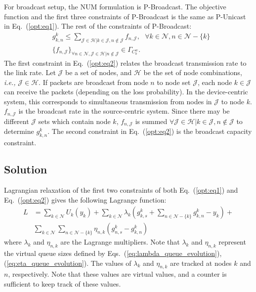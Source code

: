 \documentclass[conference]{IEEEtran}
\newcommand{\ie}{{\em i.e., }}
\newcommand{\Jset}{\mathcal{J}}
\newcommand{\Nset}{\mathcal{N}}
\newcommand{\Hset}{\mathcal{H}}
\begin{document}
For broadcast setup, the NUM formulation is P-Broadcast. The objective function and the first three constraints of P-Broadcast is the same as P-Unicast in Eq.~(\ref{opt:eq1}). The rest of the constraints of P-Broadcast:
\begin{align} \label{opt:eq2}
&g_{k,n}^{k} \leq \sum_{\Jset \in \Hset | k \in \Jset, n \notin \Jset} f_{n,\Jset},  \mbox{ } \forall k \in \Nset, n \in \Nset - \{k\} \nonumber \\
&\{f_{n, \Jset}\}_{\forall n \in \Nset, \Jset \in \Hset | n \notin \Jset} \in \Gamma_{C_{b}^{w}}.
\end{align}
The first constraint in Eq.~(\ref{opt:eq2}) relates the broadcast transmission rate to the link rate. Let $\Jset$ be a set of nodes, and $\Hset$ be the set of node combinations, \ie $\Jset \in \Hset$. If packets are broadcast from node $n$ to node set $\Jset$, each node $k \in \Jset$ can receive the packets (depending on the loss probability). In the device-centric system, this corresponds to simultaneous transmission from nodes in $\Jset$ to node $k$. $f_{n,\Jset}$  is the broadcast rate in the source-centric system. Since there may be different $\Jset$ sets which contain node $k$, $f_{n,\Jset}$ is summed $\forall \Jset \in \Hset | k \in \Jset, n \notin \Jset$ to determine $g_{k,n}^{k}$. The second constraint in Eq.~(\ref{opt:eq2}) is the broadcast capacity constraint.


\subsection{\label{sec:NUM_Solution} Solution}
Lagrangian relaxation of the first two constraints of both Eq.~(\ref{opt:eq1}) and Eq.~(\ref{opt:eq2}) gives the following Lagrange function:
\begin{align} \label{relax:eq1}
L & = \sum_{k \in \Nset} U_{k}(y_{k}) + \sum_{k \in \Nset} \lambda_{k} (g_{k,s}^{k} + \sum_{n \in \Nset - \{k\}} g_{k,n}^{k} - y_k) + \nonumber \\
& \sum_{k \in \Nset} \sum_{n \in \Nset -\{k\}} \eta_{n,k}(g_{n,s}^{k} - g_{k,n}^{k})
\end{align} where $\lambda_{k}$ and $\eta_{n,k}$ are the Lagrange multipliers. Note that $\lambda_{k}$ and $\eta_{n,k}$ represent the virtual queue sizes defined by Eqs.~(\ref{eq:lambda_queue_evolution}),(\ref{eq:eta_queue_evolution}). The values of $\lambda_{k}$ and $\eta_{n,k}$ are tracked at nodes $k$ and $n$, respectively. Note that these values are virtual values, and a counter is sufficient to keep track of these values.
\end{document}
